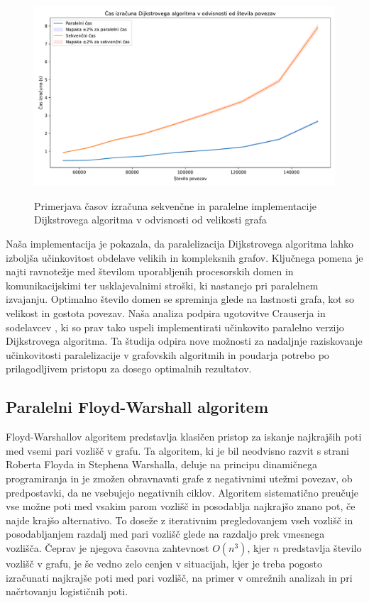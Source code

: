 \documentclass[mat1, tisk]{fmfdelo}
\begin{document}
\begin{figure}[h!]
  \centering
  \caption{Primerjava časov izračuna sekvenčne in paralelne implementacije Dijkstrovega algoritma v odvisnosti od velikosti grafa}
  \includegraphics[width=15cm]{slike/dijkstra_v_odvisnosti_od_velikosti_grafa.pdf}
  \label{fig:dijkstra_calculation_time_by_graph_size}
\end{figure}

Naša implementacija je pokazala, da paralelizacija Dijkstrovega algoritma lahko izboljša učinkovitost obdelave velikih
in kompleksnih grafov. Ključnega pomena je najti ravnotežje med številom uporabljenih procesorskih domen in
komunikacijskimi ter usklajevalnimi stroški, ki nastanejo pri paralelnem izvajanju. Optimalno število domen se spreminja
glede na lastnosti grafa, kot so velikost in gostota povezav. Naša analiza podpira ugotovitve Crauserja in
sodelavcev \cite{crauser1998parallelizing}, ki so prav tako uspeli implementirati učinkovito paralelno verzijo Dijkstrovega algoritma.
Ta študija odpira nove možnosti za nadaljnje raziskovanje učinkovitosti paralelizacije v grafovskih algoritmih in
poudarja potrebo po prilagodljivem pristopu za dosego optimalnih rezultatov.

\subsection{Paralelni Floyd-Warshall algoritem}

Floyd-Warshallov algoritem predstavlja klasičen pristop za iskanje najkrajših poti med vsemi pari vozlišč v grafu.
Ta algoritem, ki je bil neodvisno razvit s strani Roberta Floyda in Stephena Warshalla, deluje na principu dinamičnega
programiranja in je zmožen obravnavati grafe z negativnimi utežmi povezav, ob predpostavki, da ne vsebujejo negativnih ciklov.
Algoritem sistematično preučuje vse možne poti med vsakim parom vozlišč in posodablja najkrajšo znano pot, če najde krajšo alternativo.
To doseže z iterativnim pregledovanjem vseh vozlišč in posodabljanjem razdalj med pari vozlišč glede na razdaljo prek vmesnega vozlišča.
Čeprav je njegova časovna zahtevnost $O(n^3)$, kjer $n$ predstavlja število vozlišč v grafu, je še vedno zelo cenjen v situacijah, kjer
je treba pogosto izračunati najkrajše poti med pari vozlišč, na primer v omrežnih analizah in pri načrtovanju logističnih poti.
\end{document}
